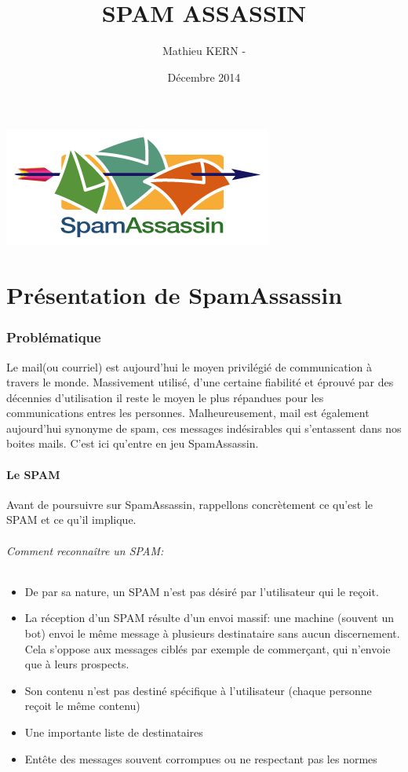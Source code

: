 \documentclass[a4paper,11pt]{article}
\title{SPAM ASSASSIN}
\date{Décembre 2014}
\author{Mathieu KERN -}
\begin{document}
\maketitle
\includegraphics{spamassassinintro.png}
\pagebreak

\tableofcontents

\pagebreak

\part{Présentation de SpamAssassin}

\section{Problématique }

  Le mail(ou courriel) est aujourd'hui le moyen privilégié de communication à travers le monde. Massivement utilisé, 
d'une certaine fiabilité et éprouvé par des décennies d'utilisation il reste le moyen le plus répandues pour 
les communications entres les personnes. Malheureusement, mail est également aujourd'hui synonyme de spam, ces messages
indésirables qui s'entassent dans nos boites mails. C'est ici qu'entre en jeu SpamAssassin.

\subsection{Le SPAM}
Avant de poursuivre sur SpamAssassin, rappellons concrètement ce qu'est le SPAM et ce qu'il implique. 

\paragraph{Comment reconnaître un SPAM:}

\begin{itemize}
 \item De par sa nature, un SPAM n'est pas désiré par l'utilisateur qui le reçoit. 
 \item La réception d'un SPAM résulte d'un envoi massif: une machine (souvent un bot) envoi le même message 
 à plusieurs destinataire sans aucun discernement. Cela s'oppose aux messages ciblés par exemple de commerçant,
 qui n’envoie que à leurs prospects.
 \item Son contenu n'est pas destiné spécifique à l'utilisateur (chaque personne reçoit le même contenu)
 \item Une importante liste de destinataires 
 \item Entête des messages souvent corrompues ou ne respectant pas les normes
\end{itemize}
\end{document}
